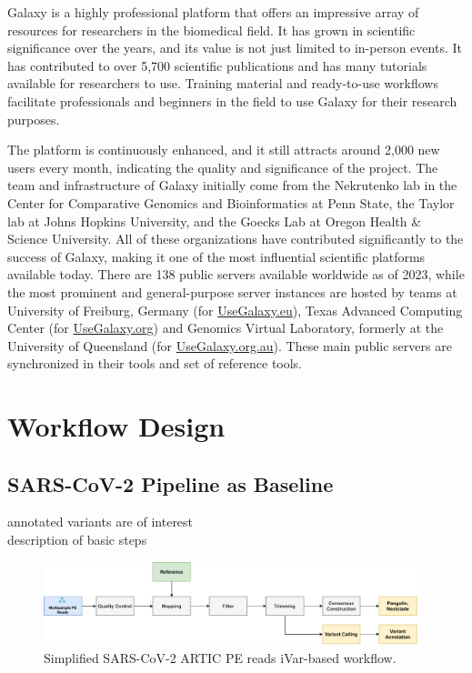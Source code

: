 Galaxy is a highly professional platform that offers an impressive array of resources for researchers in the biomedical field. It has grown in scientific significance over the years, and its value is not just limited to in-person events. It has contributed to over 5,700 scientific publications and has many tutorials available for researchers to use. Training material and ready-to-use workflows facilitate professionals and beginners in the field to use Galaxy for their research purposes.

The platform is continuously enhanced, and it still attracts around 2,000 new users every month, indicating the quality and significance of the project. The team and infrastructure of Galaxy initially come from the Nekrutenko lab in the Center for Comparative Genomics and Bioinformatics at Penn State, the Taylor lab at Johns Hopkins University, and the Goecks Lab at Oregon Health \& Science University. All of these organizations have contributed significantly to the success of Galaxy, making it one of the most influential scientific platforms available today. There are 138 public servers available worldwide as of 2023, while the most prominent and general-purpose server instances are hosted by teams at University of Freiburg, Germany (for \href{https://usegalaxy.eu/}{UseGalaxy.eu}), Texas Advanced Computing Center (for \href{https://usegalaxy.org/}{UseGalaxy.org}) and Genomics Virtual Laboratory, formerly at the University of Queensland (for \href{https://usegalaxy.org.au/}{UseGalaxy.org.au}). These main public servers are synchronized in their tools and set of reference tools. \cite{10.1093/nar/gkac247}


\section{Workflow Design}

\subsection{SARS-CoV-2 Pipeline as Baseline}
annotated variants are of interest \\
description of basic steps

\begin{figure}
	\centering
	\includegraphics[width=0.97\textwidth]{media/3-pipelines-SARS-CoV-2.pdf}
	\caption{Simplified SARS-CoV-2 ARTIC PE reads iVar-based workflow.}
	\label{fig:3-pipelines-sars}
\end{figure}


